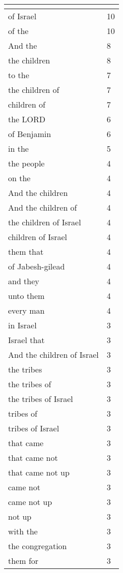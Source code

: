 \begin{center}
\begin{longtable}{|p{3.0in}|p{0.5in}|}
\hline \multicolumn{2}{c}{{ }} \\ \hline
\endfoot 
of Israel & 10\\ \hline 
of the & 10\\ \hline 
And the & 8\\ \hline 
the children & 8\\ \hline 
to the & 7\\ \hline 
the children of & 7\\ \hline 
children of & 7\\ \hline 
the LORD & 6\\ \hline 
of Benjamin & 6\\ \hline 
in the & 5\\ \hline 
the people & 4\\ \hline 
on the & 4\\ \hline 
And the children & 4\\ \hline 
And the children of & 4\\ \hline 
the children of Israel & 4\\ \hline 
children of Israel & 4\\ \hline 
them that & 4\\ \hline 
of Jabesh-gilead & 4\\ \hline 
and they & 4\\ \hline 
unto them & 4\\ \hline 
every man & 4\\ \hline 
in Israel & 3\\ \hline 
Israel that & 3\\ \hline 
And the children of Israel & 3\\ \hline 
the tribes & 3\\ \hline 
the tribes of & 3\\ \hline 
the tribes of Israel & 3\\ \hline 
tribes of & 3\\ \hline 
tribes of Israel & 3\\ \hline 
that came & 3\\ \hline 
that came not & 3\\ \hline 
that came not up & 3\\ \hline 
came not & 3\\ \hline 
came not up & 3\\ \hline 
not up & 3\\ \hline 
with the & 3\\ \hline 
the congregation & 3\\ \hline 
them for & 3\\ \hline 

\end{longtable}
\end{center}
